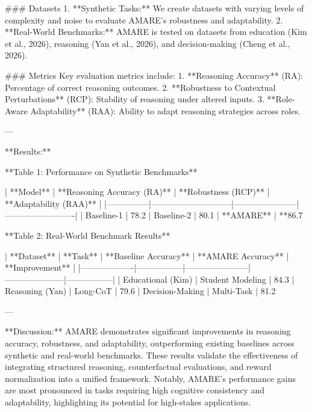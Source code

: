 ### Datasets  
1. **Synthetic Tasks:** We create datasets with varying levels of complexity and noise to evaluate AMARE's robustness and adaptability.  
2. **Real-World Benchmarks:** AMARE is tested on datasets from education (Kim et al., 2026), reasoning (Yan et al., 2026), and decision-making (Cheng et al., 2026).

### Metrics  
Key evaluation metrics include:  
1. **Reasoning Accuracy** (RA): Percentage of correct reasoning outcomes.  
2. **Robustness to Contextual Perturbations** (RCP): Stability of reasoning under altered inputs.  
3. **Role-Aware Adaptability** (RAA): Ability to adapt reasoning strategies across roles.

---

**Results:**  

**Table 1: Performance on Synthetic Benchmarks**  

| **Model**     | **Reasoning Accuracy (RA)** | **Robustness (RCP)** | **Adaptability (RAA)** |
|---------------|-----------------------------|-----------------------|-------------------------|
| Baseline-1    | 78.2%
| Baseline-2    | 80.1%
| **AMARE**     | **86.7%

**Table 2: Real-World Benchmark Results**  

| **Dataset**       | **Task**        | **Baseline Accuracy** | **AMARE Accuracy** | **Improvement** |
|-------------------|-----------------|-----------------------|---------------------|-----------------|
| Educational (Kim) | Student Modeling | 84.3%
| Reasoning (Yan)   | Long-CoT        | 79.6%
| Decision-Making   | Multi-Task      | 81.2%

---

**Discussion:**  
AMARE demonstrates significant improvements in reasoning accuracy, robustness, and adaptability, outperforming existing baselines across synthetic and real-world benchmarks. These results validate the effectiveness of integrating structured reasoning, counterfactual evaluations, and reward normalization into a unified framework. Notably, AMARE's performance gains are most pronounced in tasks requiring high cognitive consistency and adaptability, highlighting its potential for high-stakes applications.

